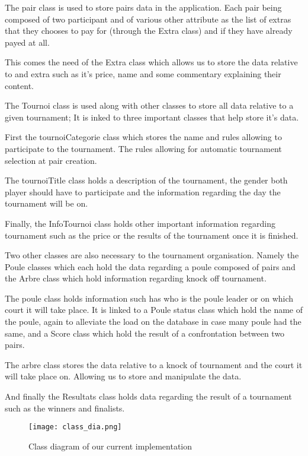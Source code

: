 The pair class is used to store pairs data in the application. Each pair being
composed of two participant and of various other attribute as the list of
extras that they chooses to pay for (through the Extra class) and if they have
already payed at all. \newline

This comes the need of the Extra class which allows us to store the data
relative to and extra such as it's price, name and some commentary explaining
their content.\newline

The Tournoi class is used along with other classes to store all data relative
to a given tournament; It is inked to three important classes that help store
it's data. \newline

First the tournoiCategorie class which stores the name and rules allowing to
participate to the tournament. The rules allowing for automatic tournament
selection at pair creation. \newline

The tournoiTitle class holds a description of the tournament, the gender both
player should have to participate and the information regarding the day the
tournament will be on. \newline

Finally, the InfoTournoi class holds other important information regarding
tournament such as the price or the results of the tournament once it is
finished.

Two other classes are also necessary to the tournament organisation. Namely the
Poule classes which each hold the data regarding a poule composed of pairs and
the Arbre class which hold information regarding knock off tournament.\newline

The poule class holds information such has who is the poule leader or on which
court it will take place. It is linked to a Poule status class which hold the
name of the poule, again to alleviate the load on the database in case many
poule had the same, and a Score class which hold the result of a confrontation
between two pairs.\newline

The arbre class stores the data relative to a knock of tournament and the court
it will take place on. Allowing us to store and manipulate the data.\newline

And finally the Resultats class holds data regarding the result of a tournament
such as the winners and finalists. \newline

\begin{figure}[!ht]
	\centering
	\texttt{[image: class\_dia.png]}
	\caption{Class diagram of our current implementation}
	\label{fig:length_eight_mouse}
\end{figure}
\FloatBarrier
